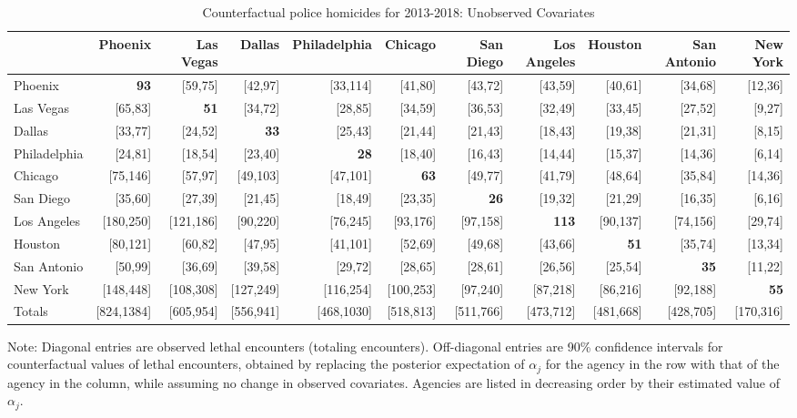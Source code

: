 \begin{table}[h!]\centering\scriptsize\tabcolsep=0.1cm\caption{Counterfactual police homicides for 2013-2018: Unobserved Covariates} \label{table:counterfactual_unobs}\begin{tabular}{lrrrrrrrrrr}\hline \hline&Phoenix&Las Vegas&Dallas&Philadelphia&Chicago&San Diego&Los Angeles&Houston&San Antonio&New York\\
\hline
Phoenix&\textbf{93}&[59,75]&[42,97]&[33,114]&[41,80]&[43,72]&[43,59]&[40,61]&[34,68]&[12,36]\\
Las Vegas&[65,83]&\textbf{51}&[34,72]&[28,85]&[34,59]&[36,53]&[32,49]&[33,45]&[27,52]&[9,27]\\
Dallas&[33,77]&[24,52]&\textbf{33}&[25,43]&[21,44]&[21,43]&[18,43]&[19,38]&[21,31]&[8,15]\\
Philadelphia&[24,81]&[18,54]&[23,40]&\textbf{28}&[18,40]&[16,43]&[14,44]&[15,37]&[14,36]&[6,14]\\
Chicago&[75,146]&[57,97]&[49,103]&[47,101]&\textbf{63}&[49,77]&[41,79]&[48,64]&[35,84]&[14,36]\\
San Diego&[35,60]&[27,39]&[21,45]&[18,49]&[23,35]&\textbf{26}&[19,32]&[21,29]&[16,35]&[6,16]\\
Los Angeles&[180,250]&[121,186]&[90,220]&[76,245]&[93,176]&[97,158]&\textbf{113}&[90,137]&[74,156]&[29,74]\\
Houston&[80,121]&[60,82]&[47,95]&[41,101]&[52,69]&[49,68]&[43,66]&\textbf{51}&[35,74]&[13,34]\\
San Antonio&[50,99]&[36,69]&[39,58]&[29,72]&[28,65]&[28,61]&[26,56]&[25,54]&\textbf{35}&[11,22]\\
New York&[148,448]&[108,308]&[127,249]&[116,254]&[100,253]&[97,240]&[87,218]&[86,216]&[92,188]&\textbf{55}\\
\hline
Totals&[824,1384]&[605,954]&[556,941]&[468,1030]&[518,813]&[511,766]&[473,712]&[481,668]&[428,705]&[170,316]\\
\hline\end{tabular}\begin{center}\begin{minipage}{1.05\textwidth} %
 {\footnotesize {\schape Note}: Diagonal entries are observed lethal encounters (totaling \totalincidentsten{} encounters). Off-diagonal entries are 90\% confidence intervals for counterfactual values of lethal encounters, obtained by replacing the posterior expectation of $\alpha_j$ for the agency in the row with that of the agency in the column, while assuming no change in observed covariates. Agencies are listed in decreasing order by their estimated value of $\alpha_j$.} 
 \end{minipage} 
 \end{center} 
 \end{table} 
